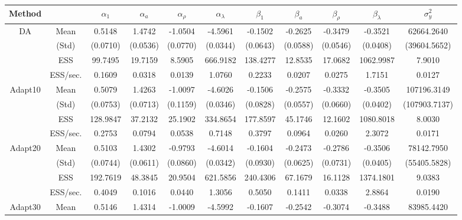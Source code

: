 {\footnotesize 
{ \renewcommand{\arraystretch}{1.2} 
\begin{table} 
\hspace*{-2.5cm} 
\begin{tabular}{cc ccc ccc ccc} 
\hline 
 Method & &  $\alpha_{1}$ &  $\alpha_{a}$ &  $\alpha_{\rho}$ &  $\alpha_{\lambda}$ &  $\beta_{1}$ &  $\beta_{a}$ &  $\beta_{\rho}$ &  $\beta_{\lambda}$ &  $\sigma^{2}_{y}$  \\ \hline  \hline
DA & Mean 
 & 0.5148  & 1.4742  & -1.0504  & -4.5961  & -0.1502  & -0.2625  & -0.3479  & -0.3521  & 62664.2640  \\  [0.75ex] 
 & (Std) 
 & (0.0710)  & (0.0536)  & (0.0770)  & (0.0344)  & (0.0643)  & (0.0588)  & (0.0546)  & (0.0408)  & (39604.5652)  \\  [0.75ex] 
 & ESS 
 & 99.7495  & 19.7159  & 8.5905  & 666.9182  & 138.4277  & 12.8535  & 17.0682  & 1062.9987  & 7.9010  \\  [0.75ex] 
[619.80 s]  & ESS/sec. 
 & 0.1609  & 0.0318  & 0.0139  & 1.0760  & 0.2233  & 0.0207  & 0.0275  & 1.7151  & 0.0127  \\  [1.3ex] 
Adapt10 & Mean 
 & 0.5079  & 1.4263  & -1.0097  & -4.6026  & -0.1506  & -0.2575  & -0.3332  & -0.3505  & 107196.3149  \\  [0.75ex] 
 & (Std) 
 & (0.0753)  & (0.0713)  & (0.1159)  & (0.0346)  & (0.0828)  & (0.0557)  & (0.0660)  & (0.0402)  & (107903.7137)  \\  [0.75ex] 
 & ESS 
 & 128.9847  & 37.2132  & 25.1902  & 334.8654  & 177.8597  & 45.1746  & 12.1602  & 1080.8018  & 8.0030  \\  [0.75ex] 
[468.45 s]  & ESS/sec. 
 & 0.2753  & 0.0794  & 0.0538  & 0.7148  & 0.3797  & 0.0964  & 0.0260  & 2.3072  & 0.0171  \\  [1.3ex] 
Adapt20 & Mean 
 & 0.5103  & 1.4302  & -0.9793  & -4.6014  & -0.1604  & -0.2473  & -0.2786  & -0.3506  & 78142.7950  \\  [0.75ex] 
 & (Std) 
 & (0.0744)  & (0.0611)  & (0.0860)  & (0.0342)  & (0.0930)  & (0.0625)  & (0.0731)  & (0.0405)  & (55405.5828)  \\  [0.75ex] 
 & ESS 
 & 192.7619  & 48.3845  & 20.9504  & 621.5856  & 240.4306  & 67.1679  & 16.1128  & 1374.1801  & 9.0383  \\  [0.75ex] 
[476.10 s]  & ESS/sec. 
 & 0.4049  & 0.1016  & 0.0440  & 1.3056  & 0.5050  & 0.1411  & 0.0338  & 2.8864  & 0.0190  \\  [1.3ex] 
Adapt30 & Mean 
 & 0.5146  & 1.4314  & -1.0009  & -4.5992  & -0.1607  & -0.2542  & -0.3074  & -0.3488  & 83985.4420  \\  [0.75ex] 

\end{tabular}
\end{table}}}

